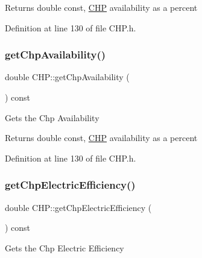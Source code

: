 \begin{DoxyReturn}{Returns}
double const, \hyperlink{class_c_h_p}{C\+HP} availability as a percent 
\end{DoxyReturn}


Definition at line 130 of file C\+H\+P.\+h.

\mbox{\label{class_c_h_p_abd1ea13cd48f5af48799891a52634340}} 
\subsubsection{\texorpdfstring{get\+Chp\+Availability()}{getChpAvailability()}\hspace{0.1cm}{\footnotesize\ttfamily [3/3]}}
{\footnotesize\ttfamily double C\+H\+P\+::get\+Chp\+Availability (\begin{DoxyParamCaption}{ }\end{DoxyParamCaption}) const\hspace{0.3cm}{\ttfamily [inline]}}

Gets the Chp Availability

\begin{DoxyReturn}{Returns}
double const, \hyperlink{class_c_h_p}{C\+HP} availability as a percent 
\end{DoxyReturn}


Definition at line 130 of file C\+H\+P.\+h.

\mbox{\label{class_c_h_p_a1d38e08a7815211361d334263832cad6}} 
\subsubsection{\texorpdfstring{get\+Chp\+Electric\+Efficiency()}{getChpElectricEfficiency()}\hspace{0.1cm}{\footnotesize\ttfamily [1/3]}}
{\footnotesize\ttfamily double C\+H\+P\+::get\+Chp\+Electric\+Efficiency (\begin{DoxyParamCaption}{ }\end{DoxyParamCaption}) const\hspace{0.3cm}{\ttfamily [inline]}}

Gets the Chp Electric Efficiency

